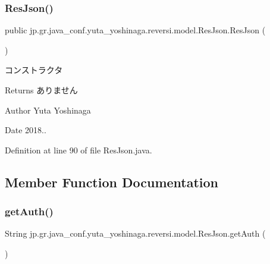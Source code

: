 \subsubsection{\texorpdfstring{Res\+Json()}{ResJson()}}
{\footnotesize\ttfamily public jp.\+gr.\+java\+\_\+conf.\+yuta\+\_\+yoshinaga.\+reversi.\+model.\+Res\+Json.\+Res\+Json (\begin{DoxyParamCaption}{ }\end{DoxyParamCaption})}



コンストラクタ 

\begin{DoxyReturn}{Returns}
ありません 
\end{DoxyReturn}
\begin{DoxyAuthor}{Author}
Yuta Yoshinaga 
\end{DoxyAuthor}
\begin{DoxyDate}{Date}
2018.. 
\end{DoxyDate}


Definition at line 90 of file Res\+Json.\+java.



\subsection{Member Function Documentation}
\mbox{\label{classjp_1_1gr_1_1java__conf_1_1yuta__yoshinaga_1_1reversi_1_1model_1_1_res_json_ae9ce58a56ca0b5302efb00692e1e78d4}} 
\subsubsection{\texorpdfstring{get\+Auth()}{getAuth()}}
{\footnotesize\ttfamily String jp.\+gr.\+java\+\_\+conf.\+yuta\+\_\+yoshinaga.\+reversi.\+model.\+Res\+Json.\+get\+Auth (\begin{DoxyParamCaption}{ }\end{DoxyParamCaption})}



